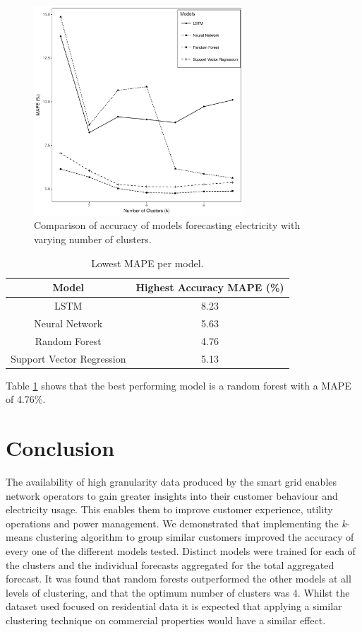 \begin{figure}
	\includegraphics[width=0.7\textwidth]{Chapter5/figures/results.pdf}
	\caption{Comparison of accuracy of models forecasting electricity with varying number of clusters.}
	\label{fig:results}
\end{figure}

\begin{table}
	\caption{Lowest MAPE per model.}
	\label{tab:results_mape}
	\begin{tabular}{cc}
		\toprule
		Model& Highest Accuracy MAPE (\%) \\
		\midrule
		LSTM & 8.23 \\
		Neural Network & 5.63 \\
		Random Forest & 4.76  \\
		Support Vector Regression & 5.13  \\
		\bottomrule
	\end{tabular}
\end{table}

Table \ref{tab:results_mape} shows that the best performing model is a random forest with a MAPE of 4.76\%. 

\section{Conclusion}

The availability of high granularity data produced by the smart grid enables network operators to gain greater insights into their customer behaviour and electricity usage. This enables them to improve customer experience, utility operations and power management. We demonstrated that implementing the \textit{k}-means clustering algorithm to group similar customers improved the accuracy of every one of the different models tested. Distinct models were trained for each of the clusters and the individual forecasts aggregated for the total aggregated forecast. It was found that random forests outperformed  the other models at all levels of clustering, and that the optimum number of clusters was 4. Whilst the dataset used focused on residential data it is expected that applying a similar clustering technique on commercial properties would have a similar effect.

